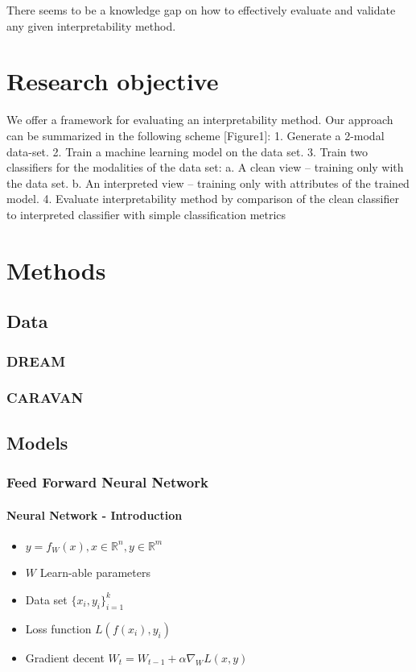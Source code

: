 \documentclass[12pt]{report}
\begin{document}
There seems to be a knowledge gap on how to
effectively evaluate and validate any given interpretability method.



\chapter{Research objective } 

We offer a framework for evaluating an interpretability method. Our approach can be summarized in
the following scheme [Figure1]:
1. Generate a 2-modal data-set.
2. Train a machine learning model on the data set.
3. Train two classifiers for the modalities of the data set:
a. A clean view – training only with the data set.
b. An interpreted view – training only with attributes of the trained model.
4. Evaluate interpretability method by comparison of the clean classifier to interpreted classifier
with simple classification metrics

\chapter{Methods} 
\section{Data}
\subsection{DREAM}
\subsection{CARAVAN}

\section{Models}
\subsection{Feed Forward Neural Network}

\subsubsection{Neural Network - Introduction}
\begin{itemize}
	\item $y = f_{W}(x), x \in \mathbb{R}^n, y \in \mathbb{R}^m$ 
	\item $W$ Learn-able parameters
	\item Data set $\{x_i, y_i \}_{i=1}^k$
	\item Loss function $L(f(x_i), y_i)$
	\item Gradient decent $W_t = W_{t-1} + \alpha \nabla_{W}L(x,y) $ 
\end{itemize}
\end{document}
